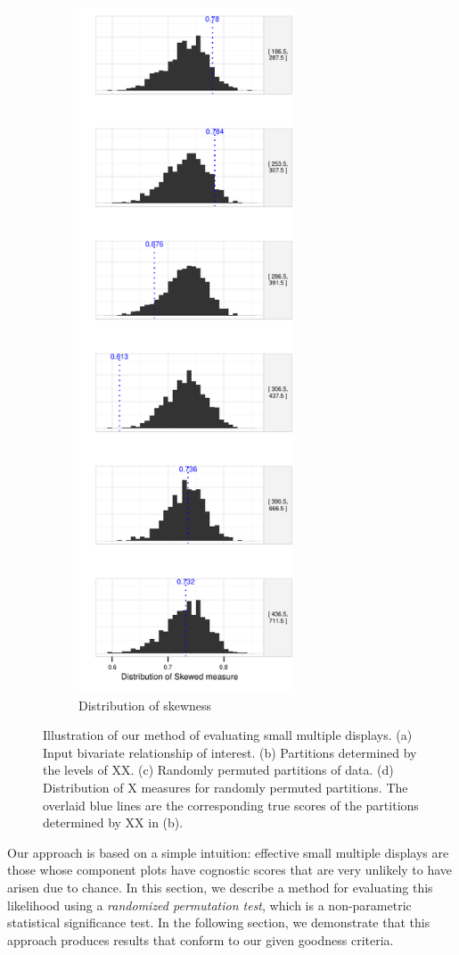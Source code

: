 \begin{figure}
\begin{subfigure}[t]{2.5in}
 	\includegraphics[width=2.5in]{images/hist-TAX.pdf}
	\caption{Distribution of skewness}
	 \label{fig:method_dist}
     \end{subfigure}
   \caption{Illustration of our method of evaluating small multiple displays. (a) Input bivariate relationship of interest. (b) Partitions determined by the levels of XX. (c) Randomly permuted partitions of data. (d) Distribution of X measures for randomly permuted partitions. The overlaid blue lines are the corresponding true scores of the partitions determined by XX in (b).}
\end{figure}

Our approach is based on a simple intuition: effective small multiple displays are those whose component plots have cognostic scores that are very unlikely to have arisen due to chance. In this section, we describe a method for evaluating this likelihood using a \emph{randomized permutation test}, which is a non-parametric statistical significance test. In the following section, we demonstrate that this approach produces results that conform to our given goodness criteria.

